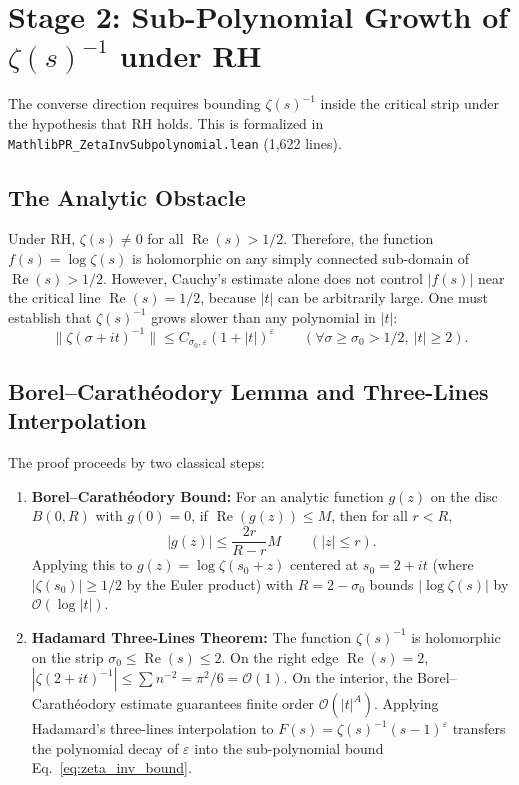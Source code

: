 \documentclass[11pt,a4paper]{article}
\theoremstyle{definition}
\begin{document}
\section{Stage 2: Sub-Polynomial Growth of \texorpdfstring{$\zeta(s)^{-1}$}{1/zeta(s)} under RH}
\label{sec:zeta_inv_growth}

The converse direction requires bounding $\zeta(s)^{-1}$ inside the critical strip under the hypothesis that RH holds. This is formalized in \texttt{MathlibPR\_ZetaInvSubpolynomial.lean} (1,622 lines).

\subsection{The Analytic Obstacle}
Under RH, $\zeta(s) \ne 0$ for all $\operatorname{Re}(s) > 1/2$. Therefore, the function $f(s) = \log \zeta(s)$ is holomorphic on any simply connected sub-domain of $\operatorname{Re}(s) > 1/2$. However, Cauchy's estimate alone does not control $|f(s)|$ near the critical line $\operatorname{Re}(s) = 1/2$, because $|t|$ can be arbitrarily large. One must establish that $\zeta(s)^{-1}$ grows slower than any polynomial in $|t|$:
\begin{equation}
\label{eq:zeta_inv_bound}
\bigl\|\zeta(\sigma + it)^{-1}\bigr\| \le C_{\sigma_0, \varepsilon} (1 + |t|)^\varepsilon \qquad (\forall \sigma \ge \sigma_0 > 1/2,\ |t| \ge 2).
\end{equation}

\subsection{Borel--Carath\'eodory Lemma and Three-Lines Interpolation}
The proof proceeds by two classical steps:
\begin{enumerate}[label=(\alph*)]
  \item \textbf{Borel--Carath\'eodory Bound:} For an analytic function $g(z)$ on the disc $B(0, R)$ with $g(0) = 0$, if $\operatorname{Re}(g(z)) \le M$, then for all $r < R$,
  \begin{equation}
  \label{eq:borel_caratheodory}
  |g(z)| \le \frac{2r}{R - r} M \qquad (|z| \le r).
  \end{equation}
  Applying this to $g(z) = \log \zeta(s_0 + z)$ centered at $s_0 = 2 + it$ (where $|\zeta(s_0)| \ge 1/2$ by the Euler product) with $R = 2 - \sigma_0$ bounds $|\log \zeta(s)|$ by $\mathcal{O}(\log |t|)$.
  \item \textbf{Hadamard Three-Lines Theorem:} The function $\zeta(s)^{-1}$ is holomorphic on the strip $\sigma_0 \le \operatorname{Re}(s) \le 2$. On the right edge $\operatorname{Re}(s) = 2$, $|\zeta(2 + it)^{-1}| \le \sum n^{-2} = \pi^2/6 = \mathcal{O}(1)$. On the interior, the Borel--Carath\'eodory estimate guarantees finite order $\mathcal{O}(|t|^A)$. Applying Hadamard's three-lines interpolation to $F(s) = \zeta(s)^{-1} (s-1)^\varepsilon$ transfers the polynomial decay of $\varepsilon$ into the sub-polynomial bound Eq.~\eqref{eq:zeta_inv_bound}.
\end{enumerate}
\end{document}
